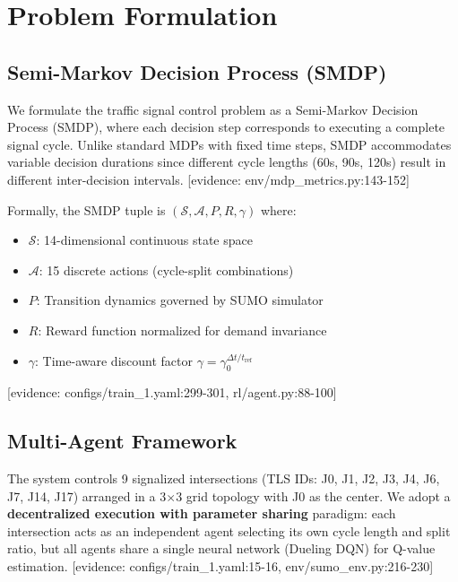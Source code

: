 
\section{Problem Formulation}
\label{sec:problem_formulation}

\subsection{Semi-Markov Decision Process (SMDP)}

We formulate the traffic signal control problem as a Semi-Markov Decision Process (SMDP), where each decision step corresponds to executing a complete signal cycle. Unlike standard MDPs with fixed time steps, SMDP accommodates variable decision durations since different cycle lengths (60s, 90s, 120s) result in different inter-decision intervals.
[evidence: env/mdp\_metrics.py:143-152]

Formally, the SMDP tuple is $(\mathcal{S}, \mathcal{A}, P, R, \gamma)$ where:
\begin{itemize}
    \item $\mathcal{S}$: 14-dimensional continuous state space
    \item $\mathcal{A}$: 15 discrete actions (cycle-split combinations)
    \item $P$: Transition dynamics governed by SUMO simulator
    \item $R$: Reward function normalized for demand invariance
    \item $\gamma$: Time-aware discount factor $\gamma = \gamma_0^{\Delta t / t_{\text{ref}}}$
\end{itemize}
[evidence: configs/train\_1.yaml:299-301, rl/agent.py:88-100]

\subsection{Multi-Agent Framework}

The system controls 9 signalized intersections (TLS IDs: J0, J1, J2, J3, J4, J6, J7, J14, J17) arranged in a 3$\times$3 grid topology with J0 as the center. We adopt a \textbf{decentralized execution with parameter sharing} paradigm: each intersection acts as an independent agent selecting its own cycle length and split ratio, but all agents share a single neural network (Dueling DQN) for Q-value estimation.
[evidence: configs/train\_1.yaml:15-16, env/sumo\_env.py:216-230]

